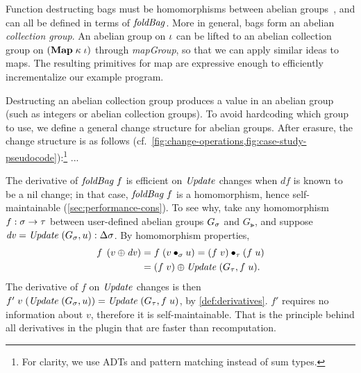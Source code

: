 \begin{oldSec}
Function destructing bags must be homomorphisms between abelian
groups~\citep{GlucheGrust97Incr}, and can all be defined in terms
of $\mathit{foldBag}$. More in general, bags form an abelian
\emph{collection group}.
%
%
An abelian group on $\iota$ can be lifted to an abelian collection
group on $(\HashMap{\kappa}{\Gi})$ through \emph{mapGroup}, so that we
can apply similar ideas to maps. The resulting primitives for map
are expressive enough to efficiently incrementalize our example
program.

Destructing an abelian collection group produces a value in an
abelian group (such as integers or abelian collection groups). To
avoid hardcoding which group to use, we define a general change
structure for abelian groups. After erasure, the change structure is as follows
(cf.~\cref{fig:change-operations,fig:case-study-pseudocode}):\footnote{For clarity, we use ADTs and pattern matching instead of sum types.}
...

The derivative of $\App{\FOLDBAG}{f}$ is efficient on $\mathit{Update}$ changes when $df$ is
known to be a nil change; in that case,
$\App{\FOLDBAG}{f}$ is a homomorphism, hence self-maintainable (\cref{sec:performance-cons}). To see why, take any homomorphism $\HasType f {\Fun \Gs \Gt}$ 
between user-defined
abelian groups $G_\sigma$ and $G_\Gt$, and suppose
$\D v = \HasType{\Term{Update} \; (G_\Gs, u)}{\Change \Gs}$. By homomorphism properties,
\begin{align*}
\App f {\Update*{v}{\D v}}
&= \App f {(v \bullet_\Gs u)}
= \App* f v  \bullet_\Gt \App* f u \\
&= \Update{\App* f v}{\Term{Update} \;(G_\Gt, \App f u)}.
\end{align*}
The derivative of $f$ on
$\mathit{Update}$ changes is then $\App{\App{f'}{v}}{(\Term{Update} \; (G_\Gs, u))} = \Term{Update} \; (G_\Gt, \App f u)$,
by \cref{def:derivatives}.
$f'$
requires no information about $v$, therefore it is
self-maintainable. That is the
principle behind all derivatives in the plugin that are faster
than recomputation.
\end{oldSec}

